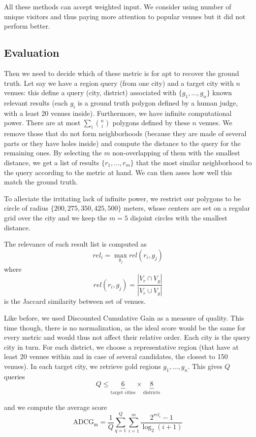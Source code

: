 All these methods can accept weighted input. We consider using number of unique
visitors and thus paying more attention to popular venues but it did not
perform better.

\subsection{Evaluation}

Then we need to decide which of these metric is for apt to recover the ground
truth. Let say we have a region query (from one city) and a target city with
$n$ venues:  this define a query \textsf{(city, district)} associated with
$\{g_1, \ldots, g_n\}$ known relevant results (each $g_i$ is a ground truth
polygon defined by a human judge, with a least 20 venues inside). Furthermore,
we have infinite computational power. There are at most $\sum_i \binom{n}{i}$
polygons defined by these $n$ venues. We remove those that do not form
neighborhoods (because they are made of several parts or they have holes
inside) and compute the distance to the query for the remaining ones. By
selecting the $m$ non-overlapping of them with the smallest distance, we get a
list of results $\{r_1, \ldots, r_m\}$ that the most similar neighborhood to
the query according to the metric at hand. We can then asses how well this
match the ground truth.

To alleviate the irritating lack of infinite power, we restrict our polygons to
be circle of radius $\{200, 275, 350, 425, 500\}$ meters, whose centers are set
on a regular grid over the city and we keep the $m = 5$ disjoint circles with
the smallest distance.

The relevance of each result list is computed as 
\[ rel_i = \max_{g_j} rel(r_i, g_j) \]
where
\[ rel(r_i, g_j) = \frac{| V_r \cap V_g|}{|V_r \cup V_g|} \]
is the Jaccard similarity between set of venues.

Like before, we used Discounted Cumulative Gain as a measure of quality. This
time though, there is no normalization, as the ideal score would be the same
for every metric and would thus not affect their relative order. Each city is
the query city in turn. For each district, we choose a representative region
(that have at least 20 venues within and in case of several candidates, the
closest to 150 venues). In each target city, we retrieve gold regions $g_1,
\ldots, g_n$.
This gives $Q$ queries \[
	Q \leq \underbrace{6}_{\text{target cities}} \times
	\underbrace{8}_{\text{districts}} \]

and we compute the average score \[
\mathrm{ADCG_{m}} = \frac{1}{Q}\sum_{q=1}^Q \sum_{i=1}^m \frac{ 2^{rel_{i}} - 1 }{\log_{2}(i+1)}
\]

